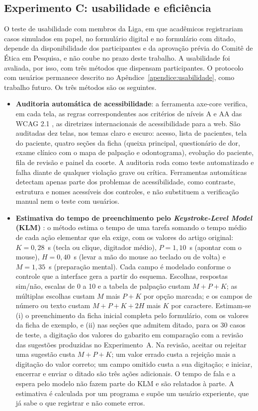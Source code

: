 \subsection{Experimento C: usabilidade e eficiência}
\label{sec:exp-usabilidade}

O teste de usabilidade com membros da Liga, em que acadêmicos registrariam casos simulados em papel, no formulário digital e no formulário com ditado, depende da disponibilidade dos participantes e da aprovação prévia do Comitê de Ética em Pesquisa, e não coube no prazo deste trabalho. A usabilidade foi avaliada, por isso, com três métodos que dispensam participantes. O protocolo com usuários permanece descrito no Apêndice~\ref{apendice:usabilidade}, como trabalho futuro. Os três métodos são os seguintes.

\begin{itemize}
	\item \textbf{Auditoria automática de acessibilidade}: a ferramenta axe-core \cite{axe} verifica, em cada tela, as regras correspondentes aos critérios de níveis A e AA das WCAG 2.1 \cite{wcag21}, as diretrizes internacionais de acessibilidade para a web. São auditadas dez telas, nos temas claro e escuro: acesso, lista de pacientes, tela do paciente, quatro seções da ficha (queixa principal, questionário de dor, exame clínico com o mapa de palpação e odontograma), evolução do paciente, fila de revisão e painel da coorte. A auditoria roda como teste automatizado e falha diante de qualquer violação grave ou crítica. Ferramentas automáticas detectam apenas parte dos problemas de acessibilidade, como contraste, estrutura e nomes acessíveis dos controles, e não substituem a verificação manual nem o teste com usuários.
	\item \textbf{Estimativa do tempo de preenchimento pelo \textit{Keystroke-Level Model} (KLM)} \cite{card1980}: o método estima o tempo de uma tarefa somando o tempo médio de cada ação elementar que ela exige, com os valores do artigo original: $K = 0{,}28$~s (tecla ou clique, digitador médio), $P = 1{,}10$~s (apontar com o mouse), $H = 0{,}40$~s (levar a mão do mouse ao teclado ou de volta) e $M = 1{,}35$~s (preparação mental). Cada campo é modelado conforme o controle que a interface gera a partir do esquema. Escolhas, respostas sim/não, escalas de 0 a 10 e a tabela de palpação custam $M + P + K$; as múltiplas escolhas custam $M$ mais $P + K$ por opção marcada; e os campos de número ou texto custam $M + P + K + 2H$ mais $K$ por caractere. Estimam-se (i) o preenchimento da ficha inicial completa pelo formulário, com os valores da ficha de exemplo, e (ii) nas seções que admitem ditado, para os 30 casos de teste, a digitação dos valores do gabarito em comparação com a revisão das sugestões produzidas no Experimento~A. Na revisão, aceitar ou rejeitar uma sugestão custa $M + P + K$; um valor errado custa a rejeição mais a digitação do valor correto; um campo omitido custa a sua digitação; e iniciar, encerrar e enviar o ditado são três ações adicionais. O tempo de fala e a espera pelo modelo não fazem parte do KLM e são relatados à parte. A estimativa é calculada por um programa e supõe um usuário experiente, que já sabe o que registrar e não comete erros.

\end{itemize}
